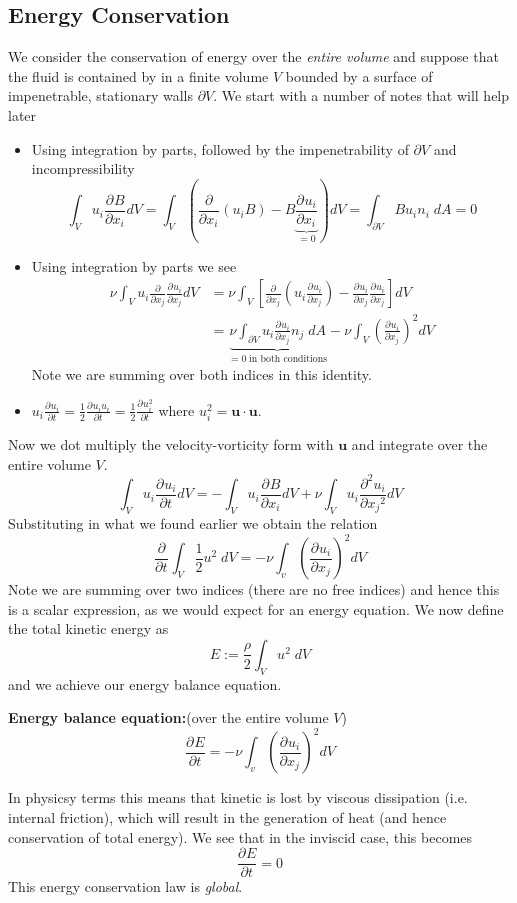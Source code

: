 \documentclass[11pt]{article}
\newcommand*{\pd}[3][]{\ensuremath{\frac{\partial^{#1} {#2}}{\partial {#3}^{#1}}}}
\newcommand{\defeq}{:=}
\newcommand{\mv}[1]{\bm{#1}}
\newcommand{\mdf}[1]{{\color{red}#1}}
\newenvironment{formula}
	{\begin{mdframed}[backgroundcolor=white, roundcorner=5pt, linewidth=1pt, linecolor=red]}
	{\end{mdframed}}
\begin{document}
\subsection{Energy Conservation}
We consider the conservation of energy over the \emph{entire volume} and suppose that the fluid is contained by in a finite volume $V$ bounded by a surface of impenetrable, stationary walls $\partial V$.
We start with a number of notes that will help later
\begin{itemize}
	\item Using integration by parts, followed by the impenetrability of $\partial V$ and incompressibility
		$$\int_V u_i\pd{B}{x_i}dV=\int_V\left(\pd{}{x_i}(u_iB)-B\underbrace{\pd{u_i}{x_i}}_{=0}\right)dV=\int_{\partial V} Bu_in_i\; dA = 0$$
	\item Using integration by parts we see
		\begin{align*}
			\nu\int_V u_i\pd{}{x_j}\pd{u_i}{x_j}dV &= \nu \int_V \left[\pd{}{x_j}\left(u_i\pd{u_i}{x_j}\right)-\pd{u_i}{x_j}\pd{u_i}{x_j}\right]dV\\
												   &= \underbrace{\nu \int_{\partial V} u_i\pd{u_i}{x_j}n_j\;dA}_{=0\;\text{in both conditions}} - \nu \int_{V} \left(\pd{u_i}{x_j}\right)^2 dV
		\end{align*}
	Note we are summing over both indices in this identity.
\item $u_i\pd{u_i}{t}=\frac{1}{2}\pd{u_iu_i}{t}=\frac{1}{2}\pd{u_i^2}{t}$ where $u_i^2=\mv{u}\cdot{\mv{u}}$.
\end{itemize}
Now we dot multiply the velocity-vorticity form with $\mv{u}$ and integrate over the entire volume $V$.
$$\int_V u_i\pd{u_i}{t}dV = - \int_V u_i\pd{B}{x_i}dV + \nu \int_V u_i\pd[2]{u_i}{x_j}dV$$
Substituting in what we found earlier we obtain the relation
$$\pd{}{t}\int_V\frac{1}{2}u^2\;dV=-\nu\int_v\left(\pd{u_i}{x_j}\right)^2dV$$
Note we are summing over two indices (there are no free indices) and hence this is a scalar expression, as we would expect for an energy equation.
We now define the \mdf{total kinetic energy} as
$$E\defeq \frac{\rho}{2}\int_V u^2\;dV$$
and we achieve our energy balance equation.
\begin{formula}
	\textbf{Energy balance equation:}(over the entire volume $V$)
	$$\pd{E}{t}=-\nu\int_v\left(\pd{u_i}{x_j}\right)^2dV$$
\end{formula}
In physicsy terms this means that kinetic is lost by viscous dissipation (i.e. internal friction), which will result in the generation of heat (and hence conservation of total energy).
We see that in the inviscid case, this becomes
$$\pd{E}{t}=0$$
This energy conservation law is \emph{global}.
\end{document}

